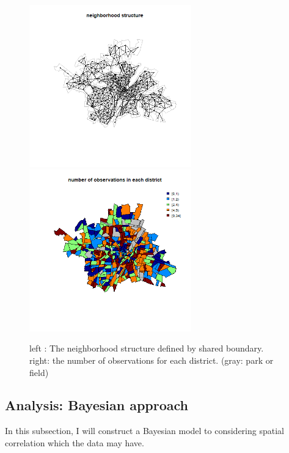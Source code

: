 \documentclass{article}
\begin{document}
\begin{figure}[!h]
    \centering
    \includegraphics[width=7cm]{map_neighborhood_structure.png}
    \includegraphics[width=7cm]{map_obsnum.png}
    \caption{left : The neighborhood structure defined by shared boundary.
    \\right: the number of observations for each district. (gray: park or field)}
\end{figure}



\clearpage
\subsection{Analysis: Bayesian approach}
In this subsection, I will construct a Bayesian model 
to considering spatial correlation which the data may have.
\end{document}
